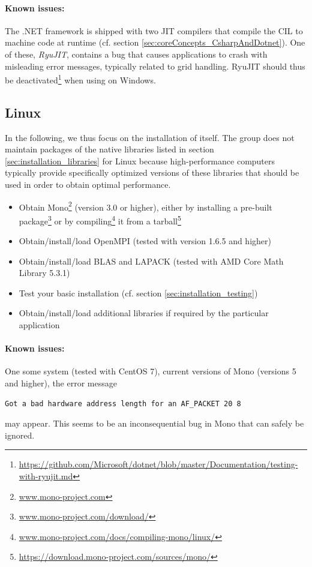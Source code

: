 \documentclass[a4paper,10pt]{report} %
\begin{document}
\paragraph{Known issues:}
The .NET framework is shipped with two JIT compilers that compile the CIL to machine code at runtime (cf. section \ref{sec:coreConcepts_CsharpAndDotnet}). One of these, \emph{RyuJIT}, contains a bug that causes \BoSSS{} applications to crash with misleading error messages, typically related to grid handling. RyuJIT should thus be deactivated\footnote{\url{https://github.com/Microsoft/dotnet/blob/master/Documentation/testing-with-ryujit.md}} when using \BoSSS{} on Windows.


\subsection{Linux}
In the following, we thus focus on the installation of \BoSSS{} itself. 
The \BoSSS{} group does not maintain packages of the native libraries listed in section \ref{sec:installation_libraries} for Linux because high-performance computers typically provide specifically optimized versions of these libraries that should be used in order to obtain optimal performance. 

\begin{itemize}
	\item Obtain Mono\footnote{\url{www.mono-project.com}} (version 3.0 or higher), either by installing a pre-built package\footnote{\url{www.mono-project.com/download/}} or by compiling\footnote{\url{www.mono-project.com/docs/compiling-mono/linux/}} it from a tarball\footnote{\url{https://download.mono-project.com/sources/mono/}}
	\item Obtain/install/load OpenMPI (tested with version 1.6.5 and higher)
	\item Obtain/install/load BLAS and LAPACK (tested with AMD Core Math Library 5.3.1)
	\item Test your basic installation (cf. section \ref{sec:installation_testing})
	\item Obtain/install/load additional libraries if required by the particular \BoSSS{} application
\end{itemize}


\paragraph{Known issues:}
One some system (tested with CentOS 7), current versions of Mono (versions 5 and higher), the error message
\begin{verbatim}
Got a bad hardware address length for an AF_PACKET 20 8
\end{verbatim}
may appear. This seems to be an inconsequential bug in Mono that can safely be ignored.
\end{document}
